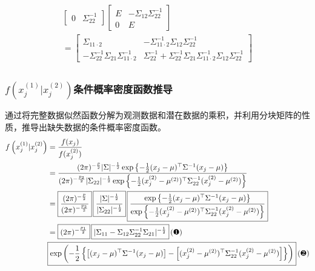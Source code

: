 \documentclass{article} %
\begin{document}
\[\begin{gathered}
\begin{bmatrix}
                0 & \Sigma_{22}^{-1}
            \end{bmatrix}
            \begin{bmatrix}
                E & -\Sigma_{12}\Sigma_{22}^{-1}\\
                0 & E
            \end{bmatrix}\\
            =\boxed{\begin{bmatrix}
                \Sigma_{11\cdot 2} & -\Sigma_{11\cdot 2}^{-1}\Sigma_{12}\Sigma_{22}^{-1}\\
                -\Sigma_{22}^{-1}\Sigma_{21}\Sigma_{11\cdot 2}^{-1} & \Sigma_{22}^{-1}+\Sigma_{22}^{-1}\Sigma_{21}\Sigma_{11\cdot 2}^{-1}\Sigma_{12}\Sigma_{22}^{-1}
            \end{bmatrix}}\\
        \end{gathered}
    \]

    \subsubsection{\(f \left(x_j^{(1)}|x_j^{(2)} \right)\)条件概率密度函数推导}
    通过将完整数据似然函数分解为观测数据和潜在数据的乘积，并利用分块矩阵的性质，推导出缺失数据的条件概率密度函数。
    \[
        \begin{aligned}
            f \left(x_j^{(1)}|x_j^{(2)} \right)
            &=\frac{f(x_j)}{f(x_j^{(2)})}\\
            &=\frac{(2\pi)^{-\frac{p}{2}}|\Sigma|^{-\frac{1}{2}}\exp\left\{-\frac{1}{2}(x_j-\mu)^\top\Sigma^{-1}(x_j-\mu)\right\}}
                    {(2\pi)^{-\frac{p_{2}}{2}}|\Sigma_{22}|^{-\frac{1}{2}}\exp\left\{-\frac{1}{2}(x_j^{(2)}-\mu^{(2)})^\top\Sigma_{22}^{-1}(x_j^{(2)}-\mu^{(2)})\right\}}\\
            &=\boxed{\frac{(2\pi)^{-\frac{p}{2}}}{(2\pi)^{-\frac{p_{2}}{2}}}} \, \boxed{\frac{|\Sigma|^{-\frac{1}{2}}}{|\Sigma_{22}|^{-\frac{1}{2}}}} \,  \boxed{\frac{\exp\left\{-\frac{1}{2}(x_j-\mu)^\top\Sigma^{-1}(x_j-\mu)\right\}}
            {\exp\left\{-\frac{1}{2}(x_j^{(2)}-\mu^{(2)})^\top\Sigma_{22}^{-1}(x_j^{(2)}-\mu^{(2)})\right\}}}\\
            &=\boxed{(2\pi)^{-\frac{p_{1}}{2}}}\,
            \boxed{|\Sigma_{11}-\Sigma_{12}\Sigma_{22}^{-1}\Sigma_{21}|^{-\frac{1}{2}}} \, \text{(\ding{182})}\\
            &\boxed{\exp\left(-\frac{1}{2}\left\{ \left[ (x_j-\mu)^\top \Sigma^{-1} (x_j-\mu) \right] - \left[ (x_j^{(2)}-\mu^{(2)})^\top \Sigma_{22}^{-1} (x_j^{(2)}-\mu^{(2)})  \right] \right\} \right)} \, \text{(\ding{183})}
        \end{aligned}
    \]
\end{document}
